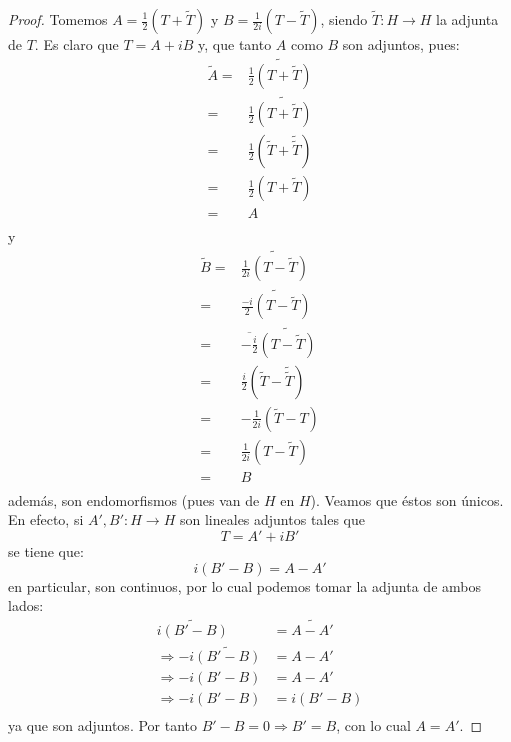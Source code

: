 \documentclass[12pt]{report}
\newcounter{it}
\theoremstyle{largebreak}
\newcommand\cf[3]{\ensuremath{#1:#2\rightarrow#3}}
\newcommand\adj[1]{\ensuremath{\widetilde{#1}}}
\newcommand\conj[1]{\ensuremath{\overline{#1}}}
\begin{document}
    \begin{proof}
        Tomemos $A=\frac{1}{2}(T+\adj{T})$ y $B=\frac{1}{2i}(T-\adj{T})$, siendo $\cf{\adj{T}}{H}{H}$ la adjunta de $T$. Es claro que $T=A+iB$ y, que tanto $A$ como $B$ son adjuntos, pues:
        \begin{equation*}
            \begin{split}
                \adj{A}=&\adj{\frac{1}{2}(T+\adj{T})} \\
                =&\frac{1}{2}\adj{(T+\adj{T})} \\
                =&\frac{1}{2}(\adj{T}+\adj{\adj{T}}) \\
                =&\frac{1}{2}(T+\adj{T}) \\
                =&A\\
            \end{split}
        \end{equation*}
        y
        \begin{equation*}
            \begin{split}
                \adj{B}=&\adj{\frac{1}{2i}(T-\adj{T})} \\
                =&\adj{\frac{-i}{2}(T-\adj{T})} \\
                =&\conj{-\frac{i}{2}}\adj{(T-\adj{T})} \\
                =&\frac{i}{2}(\adj{T}-\adj{\adj{T}}) \\
                =&-\frac{1}{2i}(\adj{T}-T) \\
                =&\frac{1}{2i}(T-\adj{T}) \\
                =&B \\
            \end{split}
        \end{equation*}
        además, son endomorfismos (pues van de $H$ en $H$). Veamos que éstos son únicos. En efecto, si $\cf{A',B'}{H}{H}$ son lineales adjuntos tales que
        \begin{equation*}
            T=A'+iB'
        \end{equation*}
        se tiene que:
        \begin{equation*}
            i(B'-B)=A-A'
        \end{equation*}
        en particular, son continuos, por lo cual podemos tomar la adjunta de ambos lados:
        \begin{equation*}
            \begin{split}
                \adj{i(B'-B)}&=\adj{A-A'} \\
                \Rightarrow -i\adj{(B'-B)}&=A-A'\\
                \Rightarrow -i(B'-B)&=A-A'\\
                \Rightarrow -i(B'-B)&=i(B'-B)\\
            \end{split}
        \end{equation*}
        ya que son adjuntos. Por tanto $B'-B=0\Rightarrow B'=B$, con lo cual $A=A'$.
    \end{proof}
\end{document}
